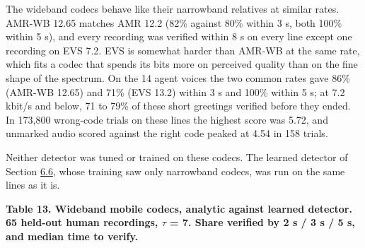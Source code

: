 \documentclass[10pt,a4paper]{article}
\begin{document}
The wideband codecs behave like their narrowband relatives at similar rates. AMR-WB 12.65 matches AMR 12.2 (82\% against 80\% within 3 s, both 100\% within 5 s), and every recording was verified within 8 s on every line except one recording on EVS 7.2. EVS is somewhat harder than AMR-WB at the same rate, which fits a codec that spends its bits more on perceived quality than on the fine shape of the spectrum. On the 14 agent voices the two common rates gave 86\% (AMR-WB 12.65) and 71\% (EVS 13.2) within 3 s and 100\% within 5 s; at 7.2 kbit/s and below, 71 to 79\% of these short greetings verified before they ended. In 173,800 wrong-code trials on these lines the highest score was 5.72, and unmarked audio scored against the right code peaked at 4.54 in 158 trials.

Neither detector was tuned or trained on these codecs. The learned detector of Section \hyperref[s-6-6]{6.6}, whose training saw only narrowband codecs, was run on the same lines as it is.

\begin{center}\small {}\label{t-13}\textbf{Table 13. Wideband mobile codecs, analytic against learned detector. 65 held-out human recordings, $\tau$ = 7. Share verified by 2 s / 3 s / 5 s, and median time to verify.}\end{center}
\end{document}

